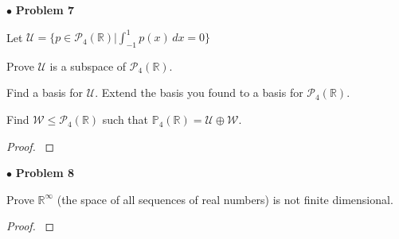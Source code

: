 \documentclass{article}
\begin{document}
\newpage
$ \bullet$ \textbf{Problem 7}
\medskip

\begin{itshape}
Let $\mathcal{U} = \{ p \in \mathcal{P}_4(\mathbb{R}) | \int_{-1}^1 p(x) \,dx = 0 \}$

Prove $\mathcal{U}$ is a subspace of $\mathcal{P}_4 (\mathbb{R})$.

Find a basis for $\mathcal{U}$. Extend the basis you found to a basis for $\mathcal{P}_4(\mathbb{R})$.

Find $\mathcal{W} \le \mathcal{P}_4(\mathbb{R})$ such that $\mathbb{P}_4(\mathbb{R}) = \mathcal{U} \oplus \mathcal{W}$.
\end{itshape}
\medskip

\begin{proof}
$ $\newline
\end{proof}

\newpage
$ \bullet$ \textbf{Problem 8}
\medskip

\begin{itshape}
Prove $\mathbb{R}^ \infty$ (the space of all sequences of real numbers) is not finite dimensional.
\end{itshape}
\medskip

\begin{proof}
$ $\newline
\end{proof}
\end{document}
